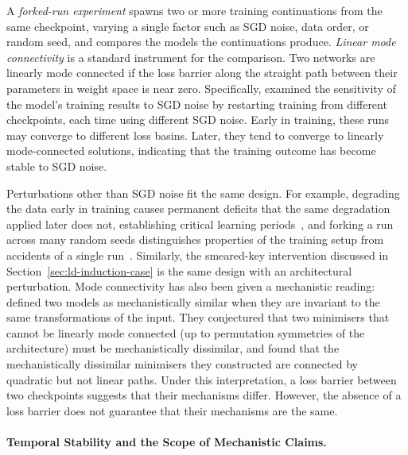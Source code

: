 \begin{definitionbox}
A \emph{forked-run experiment} spawns two or more training continuations from the same checkpoint, varying a single factor such as SGD noise, data order, or random seed, and compares the models the continuations produce. \emph{Linear mode connectivity} is a standard instrument for the comparison. Two networks are linearly mode connected if the loss barrier along the straight path between their parameters in weight space is near zero. Specifically,  examined the sensitivity of the model’s training results to SGD noise by restarting training from different checkpoints, each time using different SGD noise. Early in training, these runs may converge to different loss basins. Later, they tend to converge to linearly mode-connected solutions, indicating that the training outcome has become stable to SGD noise.
\end{definitionbox}

Perturbations other than SGD noise fit the same design. For example, degrading the data early in training causes permanent deficits that the same degradation applied later does not, establishing critical learning periods~, and forking a run across many random seeds distinguishes properties of the training setup from accidents of a single run~. Similarly, the smeared-key intervention discussed in Section~\ref{sec:ld-induction-case} is the same design with an architectural perturbation. Mode connectivity has also been given a mechanistic reading:  defined two models as mechanistically similar when they are invariant to the same transformations of the input. They conjectured that two minimisers that cannot be linearly mode connected (up to permutation symmetries of the architecture) must be mechanistically dissimilar, and found that the mechanistically dissimilar minimisers they constructed are connected by quadratic but not linear paths. Under this interpretation, a loss barrier between two checkpoints suggests that their mechanisms differ. However, the absence of a loss barrier does not guarantee that their mechanisms are the same.

\paragraph{Temporal Stability and the Scope of Mechanistic Claims.}
\label{sec:ld-temporal-stability}

